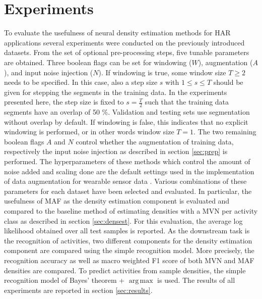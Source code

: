 \documentclass[11pt,titlepage,oneside,openany]{book}
\DeclareMathOperator*{\argmax}{arg\,max}
\begin{document}
\section{Experiments}
\label{sec:exp}
To evaluate the usefulness of neural density estimation methods for HAR applications several experiments were conducted on the previously introduced datasets. From the set of optional pre-processing steps, five tunable parameters are obtained. Three boolean flags can be set for windowing ($W$), augmentation ($A$), and input noise injection ($N$). If windowing is true, some window size $T \geq 2$ needs to be specified. In this case, also a step size $s$ with $1 \leq s \leq T$ should be given for stepping the segments in the training data. In the experiments presented here, the step size is fixed to $s = \frac{T}{2}$ such that the training data segments have an overlap of 50 \%. Validation and testing sets use segmentation without overlap by default. If windowing is false, this indicates that no explicit windowing is performed, or in other words window size $T = 1$. The two remaining boolean flags $A$ and $N$ control whether the augmentation of training data, respectively the input noise injection as described in section \ref{sec:prep} is performed. The hyperparameters of these methods which control the amount of noise added and scaling done are the default settings used in the implementation of data augmentation for wearable sensor data \cite{um_augmentation_2017}. Various combinations of these parameters for each dataset have been selected and evaluated. In particular, the usefulness of MAF as the density estimation component is evaluated and compared to the baseline method of estimating densities with a MVN per activity class as described in section \ref{sec:densest}. For this evaluation, the average log likelihood obtained over all test samples is reported. As the downstream task is the recognition of activities, two different components for the density estimation component are compared using the simple recognition model. More precisely, the recognition accuracy as well as macro weighted F1 score of both MVN and MAF densities are compared. To predict activities from sample densities, the simple recognition model of Bayes' theorem + $\argmax$ is used. The results of all experiments are reported in section \ref{sec:results}.
\end{document}
